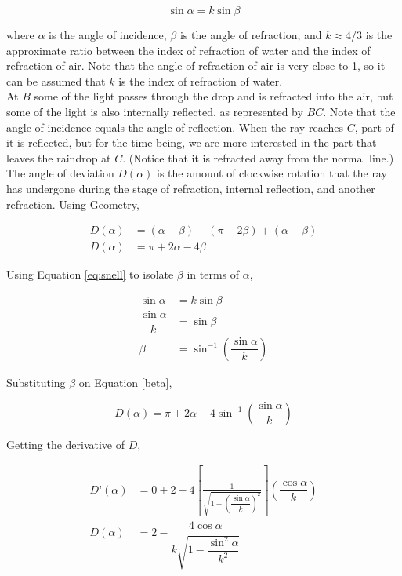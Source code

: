 \documentclass[a4paper,12pt]{article}
\begin{document}
\begin{equation} \label{eq:snell}
\sin \alpha = k \sin \beta
\end{equation}

where $\alpha$ is the angle of incidence, $\beta$ is the angle of refraction, and $k \approx 4/3$ is the approximate ratio between the index of refraction of water and the index of refraction of air. Note that the angle of refraction of air is very close to 1, so it can be assumed that $k$ is the index of refraction of water.\\

At $B$ some of the light passes through the drop and is refracted into the air, but some of the light is also internally reflected, as represented by $BC$. Note that the angle of incidence equals the angle of reflection. When the ray reaches $C$, part of it is reflected, but for the time being, we are more interested in the part that leaves the raindrop at $C$. (Notice that it is refracted away from the normal line.) \\

The angle of deviation $D(\alpha)$ is the amount of clockwise rotation that the ray has undergone during the stage of refraction, internal reflection, and another refraction. Using Geometry, 

\begin{align}
D(\alpha) &= (\alpha - \beta) + (\pi - 2\beta) +(\alpha - \beta) \nonumber\\
D(\alpha) &= \pi + 2\alpha - 4\beta
\end{align}

Using Equation \eqref{eq:snell} to isolate $\beta$ in terms of $\alpha$,

\begin{align}
\sin \alpha &= k \sin \beta \nonumber\\
\dfrac{\sin \alpha}{k} &= \sin \beta \nonumber\\
\beta &= \sin^{-1} \left(\dfrac{\sin \alpha}{k} \right) \label{beta}
\end{align}

Substituting $\beta$ on Equation \eqref{beta},

\begin{equation}
D(\alpha) = \pi + 2\alpha - 4\sin^{-1} \left( \dfrac{\sin \alpha}{k} \right)
\end{equation}

Getting the derivative of $D$,

\begin{align}
D’(\alpha) &= 0 + 2 - 4 \left[ \frac{1}{ \sqrt{1 -  \left( \dfrac{\sin \alpha}{k} \right) ^2 } } \right] \left(  \dfrac{\cos \alpha}{k} \right) \nonumber \\
D(\alpha) &= 2 - \dfrac{4 \cos \alpha}{k \sqrt{1 -  \dfrac{\sin^2 \alpha}{k^2}}}
\end{align}
\end{document}
